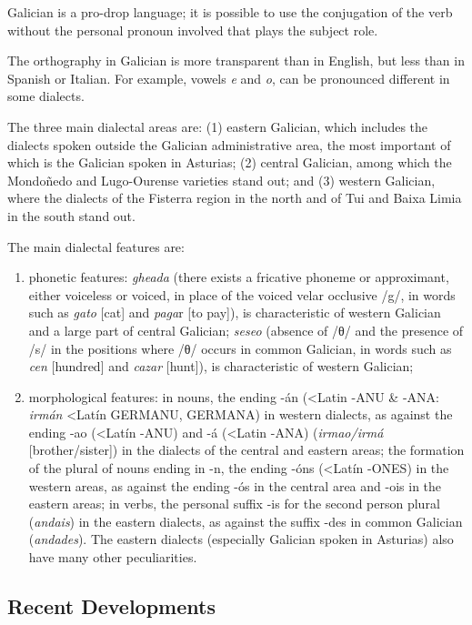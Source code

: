 \begin{multicols}{2}
\begin{itemize}
\begin{multicols}{2}
Galician is a pro-drop language; it is possible to use the conjugation of the verb without the personal pronoun involved that plays the subject role.

The orthography in Galician is more transparent than in English, but less than in Spanish or Italian. For example, vowels \textit{e} and \textit{o}, can be pronounced different in some dialects. 

The three main dialectal areas are: (1) eastern Galician, which includes the dialects spoken outside the Galician administrative area, the most important of which is the Galician spoken in Asturias; (2) central Galician, among which the Mondoñedo and Lugo-Ourense varieties stand out; and (3) western Galician, where the dialects of the Fisterra region in the north and of Tui and Baixa Limia in the south stand out.
 
The main dialectal features are:
	\begin{enumerate}
	   \item phonetic features: \textit{gheada} (there exists a fricative phoneme or approximant, either voiceless or voiced, in place of the voiced velar occlusive /g/, in words such as \textit{gato} [cat] and \textit{paga}r [to pay]), is characteristic of western Galician and a large part of central Galician; \textit{seseo} (absence of /θ/ and the presence of /s/ in the positions where /θ/ occurs in common Galician, in words such as \textit{cen} [hundred] and \textit{cazar} [hunt]), is characteristic of western Galician; 
	   \item morphological features: in nouns, the ending -án (<Latin -ANU \& -ANA: \textit{irmán} <Latín GERMANU, GERMANA) in western dialects, as against the ending -ao (<Latín -ANU) and -á (<Latin -ANA) (\textit{irmao/irmá} [brother/sister]) in the dialects of the central and eastern areas; the formation of the plural of nouns ending in -n, the ending -óns (<Latín -ONES) in the western areas, as against the ending -ós in the central area and -ois in the eastern areas; in verbs, the personal suffix -is for the second person plural (\textit{andais}) in the eastern dialects, as against the suffix -des in common Galician (\textit{andades}). The eastern dialects (especially Galician spoken in Asturias) also have many other peculiarities.
\end{enumerate}


\subsection{Recent Developments}


\end{multicols}
\end{itemize}
\end{multicols}
